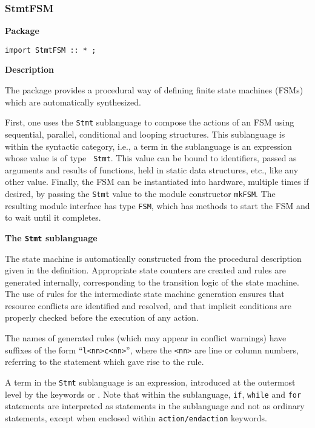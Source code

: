 \subsubsection{StmtFSM}

\label{lib-stmtfsm}

{\bf Package}

\begin{verbatim}
import StmtFSM :: * ;
\end{verbatim}


{\bf Description}

The  package provides a procedural  way of
defining finite state machines (FSMs) which are automatically synthesized.

First, one uses the \texttt{Stmt}
sublanguage to compose the actions of an FSM using
sequential, parallel, conditional and looping structures.  This
sublanguage is within the  syntactic category, i.e.,
a term in the sublanguage is an expression whose value is of type {\tt
Stmt}. This value can be bound to identifiers, passed as arguments and
results of functions, held in static data structures, etc., like any
other value.  Finally, the FSM can be instantiated into hardware,
multiple times if desired, by passing the \texttt{Stmt} value to the
module constructor \texttt{mkFSM}.  The resulting module interface has
type \texttt{FSM}, which has methods to start the FSM and to wait until
it completes.



{\bf The \texttt{Stmt} sublanguage}

\label{sec-stmtsublang}

The state machine is automatically constructed from the procedural
description given in the  definition.  Appropriate state
counters are created  and rules are generated internally, 
corresponding to the transition logic of the state machine.  The use of rules
for the intermediate state machine generation
ensures that resource conflicts are identified and resolved, and
that implicit conditions are properly checked before the execution
of any action.

The names of generated rules (which may appear in conflict warnings) have
suffixes of the form ``\verb|l<nn>c<nn>|'', where the \verb|<nn>| are line
or column numbers, referring to the statement which gave rise to the rule.


A term in the \texttt{Stmt} sublanguage is an expression, introduced at
the outermost level by the keywords  or .  Note
that within the sublanguage, \texttt{if}, \texttt{while} and \texttt{for}
statements are interpreted as statements in the sublanguage and not as
ordinary statements, except when enclosed within 
\texttt{action/endaction} keywords.  
 
